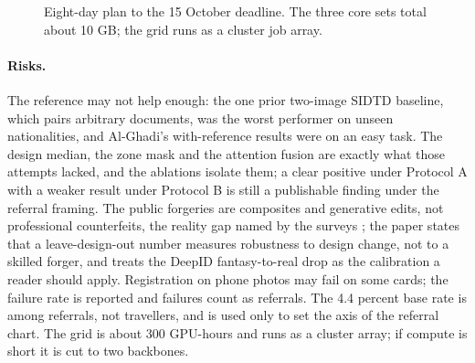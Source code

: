 \documentclass[11pt,a4paper]{article}
\begin{document}
\begin{figure}[h]
\centering
{}
\caption{Eight-day plan to the 15 October deadline. The three core sets total about 10 GB; the grid runs as a cluster job array.}
\label{fig:gantt}
\end{figure}

\paragraph{Risks.} The reference may not help enough: the one prior two-image SIDTD baseline, which pairs arbitrary documents, was the worst performer on unseen nationalities, and Al-Ghadi's with-reference results were on an easy task. The design median, the zone mask and the attention fusion are exactly what those attempts lacked, and the ablations isolate them; a clear positive under Protocol A with a weaker result under Protocol B is still a publishable finding under the referral framing. The public forgeries are composites and generative edits, not professional counterfeits, the reality gap named by the surveys \cite{das2026survey,ruiz2025review}; the paper states that a leave-design-out number measures robustness to design change, not to a skilled forger, and treats the DeepID fantasy-to-real drop as the calibration a reader should apply. Registration on phone photos may fail on some cards; the failure rate is reported and failures count as referrals. The 4.4 percent base rate is among referrals, not travellers, and is used only to set the axis of the referral chart. The grid is about 300 GPU-hours and runs as a cluster array; if compute is short it is cut to two backbones.
\end{document}
